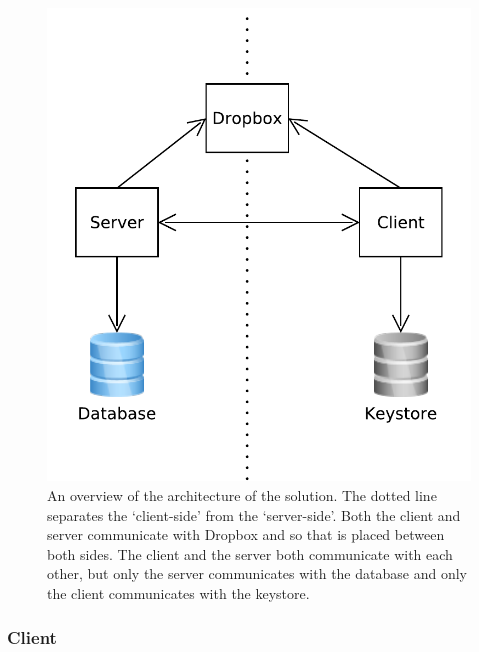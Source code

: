 \documentclass[12pt, titlepage]{article}
\begin{document}
\begin{figure}
\centerline{\includegraphics[scale=0.5]{diagrams/architecture/architecure.pdf}}
\caption{An overview of the architecture of the solution. The dotted line separates the `client-side' from the `server-side'. Both the client and server communicate with Dropbox and so that is placed between both sides. The client and the server both communicate with each other, but only the server communicates with the database and only the client communicates with the keystore.}
\label{fig:architectureOverview}
\end{figure} 

\subsubsection{Client}
\end{document}
